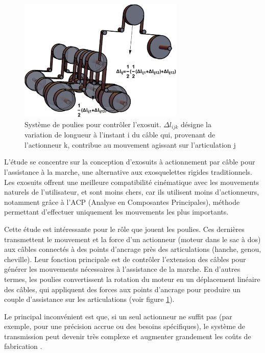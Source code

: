 \documentclass[a4paper, 11pt]{report}
\begin{document}
            \begin{figure}
                \centering
                \includegraphics[width=0.7\textwidth]{Figures/poulies.jpg}
                \caption{Système de poulies pour contrôler l'exosuit. $\Delta l_{ijk}$ désigne la variation de longueur à l'instant i du câble qui, provenant de l'actionneur k, contribue au mouvement agissant sur l'articulation j \cite{daniel_rodriguez-jorge_transmission_2023}}
                \label{fig:poulies}
            \end{figure}

            L'étude \cite{daniel_rodriguez-jorge_transmission_2023} se concentre sur la conception d'exosuits à actionnement par câble pour l'assistance à la marche, une alternative aux exosquelettes rigides traditionnels. Les exosuits offrent une meilleure compatibilité cinématique avec les mouvements naturels de l'utilisateur, et sont moins chers, car ils utilisent moins d'actionneurs, notamment grâce à l'ACP (Analyse en Composantes Principales), méthode permettant d'effectuer uniquement les mouvements les plus importants.

            Cette étude est intéressante pour le rôle que jouent les poulies. Ces dernières transmettent le mouvement et la force d'un actionneur (moteur dans le sac à dos) aux câbles connectés à des points d'ancrage près des articulations (hanche, genou, cheville). Leur fonction principale est de contrôler l'extension des câbles pour générer les mouvements nécessaires à l'assistance de la marche. En d'autres termes, les poulies convertissent la rotation du moteur en un déplacement linéaire des câbles, qui appliquent des forces aux points d'ancrage pour produire un couple d'assistance sur les articulations (voir figure \ref{fig:poulies}).

            Le principal inconvénient est que, si un seul actionneur ne suffit pas (par exemple, pour une précision accrue ou des besoins spécifiques), le système de transmission peut devenir très complexe et augmenter grandement les coûts de fabrication \cite{daniel_rodriguez-jorge_transmission_2023}.
            
\end{document}

